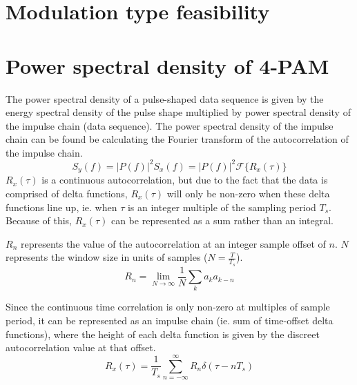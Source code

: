 \documentclass[11pt]{article}
\begin{document}

\newpage
\section{Modulation type feasibility}
\section{Power spectral density of 4-PAM}\label{rect_psd_section}
The power spectral density of a pulse-shaped data sequence is given by the
energy spectral density of the pulse shape multiplied by power spectral density
of the impulse chain (data sequence). The power spectral density of the impulse
chain can be found be calculating the Fourier transform of the autocorrelation
of the impulse chain.
\begin{equation}
    S_y(f) = |P(f)|^2S_x(f) = |P(f)|^2 \mathcal{F} \{ R_x(\tau) \}
\end{equation}
$R_x(\tau)$ is a continuous autocorrelation, but due to the fact that the data
is comprised of delta functions, $R_x(\tau)$ will only be non-zero when these
delta functions line up, ie. when $\tau$ is an integer multiple of the sampling
period $T_s$. Because of this, $R_x(\tau)$ can be represented as a sum rather
than an integral.

$R_n$ represents the value of the autocorrelation at an integer sample offset of
$n$. $N$ represents the window size in units of samples ($N = \frac{T}{T_s}$).
\begin{equation}\label{rn}
    R_n = \lim_{N \to \infty}  \frac{1}{N} \sum_{k} a_k a_{k-n}
\end{equation}

Since the continuous time correlation is only non-zero at multiples of sample
period, it can be represented as an impulse chain (ie. sum of time-offset delta
functions), where the height of each delta function is given by the discreet
autocorrelation value at that offset.
\begin{equation}\label{autocorr}
    R_x(\tau) = \frac{1}{T_s} \sum_{n=-\infty}^{\infty} R_n \delta(\tau - nT_s)
\end{equation}
\end{document}
